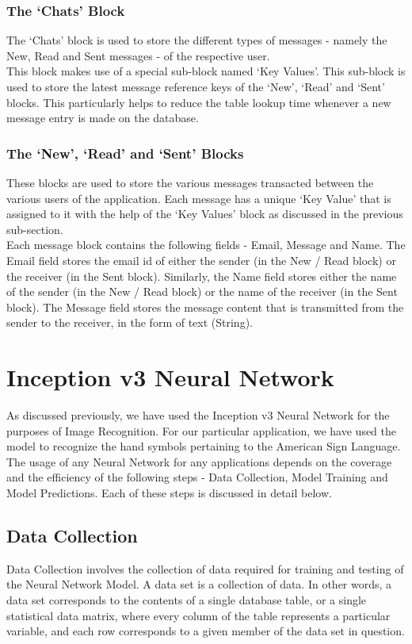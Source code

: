 \documentclass[14pt]{report}
\begin{document}
				\subsubsection{The `Chats' Block}
					The `Chats' block is used to store the different types of messages - namely the New, Read and Sent messages - of the respective user.\\

					This block makes use of a special sub-block named `Key Values'. This sub-block is used to store the latest message reference keys of the `New', `Read' and `Sent' blocks. This particularly helps to reduce the table lookup time whenever a new message entry is made on the database. 
				\subsubsection{The `New', `Read' and `Sent' Blocks}
					These blocks are used to store the various messages transacted between the various users of the application. Each message has a unique `Key Value' that is assigned to it with the help of the `Key Values' block as discussed in the previous sub-section.\\

					Each message block contains the following fields - Email, Message and Name. The Email field stores the email id of either the sender (in the New / Read block) or the receiver (in the Sent block). Similarly, the Name field stores either the name of the sender (in the New / Read block) or the name of the receiver (in the Sent block). The Message field stores the message content that is transmitted from the sender to the receiver, in the form of text (String).  
		\section{Inception v3 Neural Network}
					As discussed previously, we have used the Inception v3 Neural Network for the purposes of Image Recognition. For our particular application, we have used the model to recognize the hand symbols pertaining to the American Sign Language.\\

					The usage of any Neural Network for any applications depends on the coverage and the efficiency of the following steps - Data Collection, Model Training and Model Predictions. Each of these steps is discussed in detail below.
			\subsection{Data Collection}
					Data Collection involves the collection of data required for training and testing of the Neural Network Model. A data set is a collection of data. In other words, a data set corresponds to the contents of a single database table, or a single statistical data matrix, where every column of the table represents a particular variable, and each row corresponds to a given member of the data set in question.\\
\end{document}
